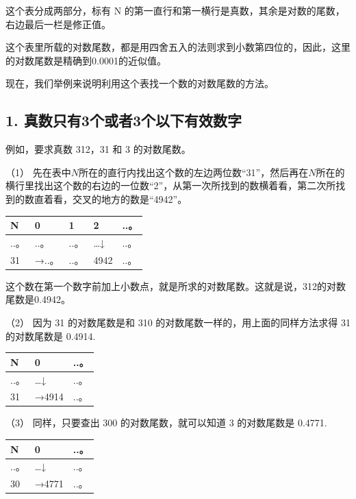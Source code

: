 这个表分成两部分，标有 N
的第一直行和第一横行是真数，其余是对数的尾数，右边最后一栏是修正值。

这个表里所载的对数尾数，都是用四舍五入的法则求到小数第四位的，因此，这里的对数尾数是精确到0.0001的近似值。

现在，我们举例来说明利用这个表找一个数的对数尾数的方法。

\subsection{1. 真数只有3个或者3个以下有效数字}

例如，要求真数 312，31 和 3 的对数尾数。

（1）
先在表中\(N\)所在的直行内找出这个数的左边两位数``31''，然后再在\(N\)所在的横行里找出这个数的右边的一位数``2''，从第一次所找到的数横着看，第二次所找到的数直着看，交叉的地方的数是``4942''。

{\def\LTcaptype{none} %
\begin{longtable}[]{@{}lllll@{}}
\toprule\noalign{}
N & 0 & 1 & 2 & ..。 \\
\midrule\noalign{}
\endhead
\bottomrule\noalign{}
\endlastfoot
..。 & ..。 & ..。 & \ldots↓ & ..。 \\
31 & →..。 & ..。 & 4942 & ..。 \\
\end{longtable}
}

这个数在第一个数字前加上小数点，就是所求的对数尾数。这就是说，312的对数尾数是0.4942。

（2） 因为 31 的对数尾数是和 310 的对数尾数一样的，用上面的同样方法求得
31 的对数尾数是 0.4914.

{\def\LTcaptype{none} %
\begin{longtable}[]{@{}lll@{}}
\toprule\noalign{}
N & 0 & ..。 \\
\midrule\noalign{}
\endhead
\bottomrule\noalign{}
\endlastfoot
..。 & \ldots↓ & ..。 \\
31 & →4914 & ..。 \\
\end{longtable}
}

（3） 同样，只要查出 300 的对数尾数，就可以知道 3 的对数尾数是 0.4771.

{\def\LTcaptype{none} %
\begin{longtable}[]{@{}lll@{}}
\toprule\noalign{}
N & 0 & ..。 \\
\midrule\noalign{}
\endhead
\bottomrule\noalign{}
\endlastfoot
..。 & \ldots↓ & ..。 \\
30 & →4771 & ..。 \\
\end{longtable}
}

